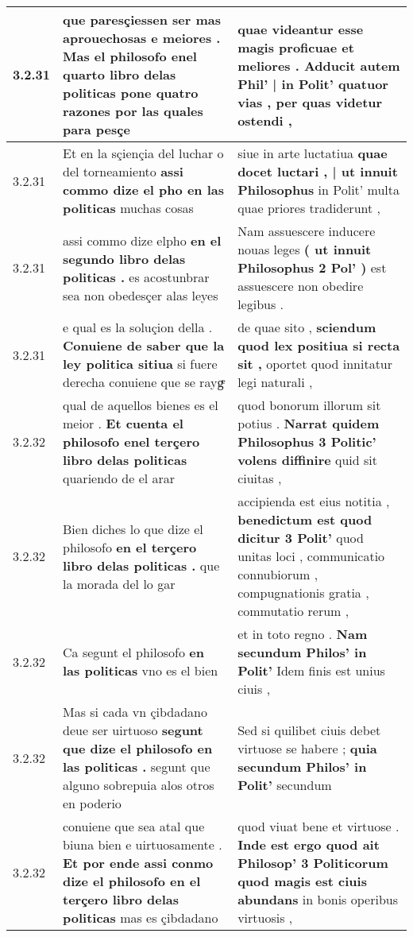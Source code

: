 \begin{tabular}{|p{1cm}|p{6.5cm}|p{6.5cm}|}
3.2.31 & que paresçiessen ser mas aprouechosas e meiores . \textbf{ Mas el philosofo enel quarto libro delas politicas pone quatro razones } por las quales para pesçe & quae videantur esse magis proficuae et meliores . \textbf{ Adducit autem Phil’ | in Polit’ quatuor vias , } per quas videtur ostendi , \\\hline
3.2.31 & Et en la sçiençia del luchar o del torneamiento \textbf{ assi commo dize el pho en las politicas } muchas cosas & siue in arte luctatiua \textbf{ quae docet luctari , | ut innuit Philosophus } in Polit’ multa quae priores tradiderunt , \\\hline
3.2.31 & assi commo dize elpho \textbf{ en el segundo libro delas politicas . } es acostunbrar sea non obedesçer alas leyes & Nam assuescere inducere nouas leges \textbf{ ( ut innuit Philosophus 2 Pol’ ) } est assuescere non obedire legibus . \\\hline
3.2.31 & e qual es la soluçion della . \textbf{ Conuiene de saber que la ley politica sitiua } si fuere derecha conuiene que se raygͤ & de quae sito , \textbf{ sciendum quod lex positiua si recta sit , } oportet quod innitatur legi naturali , \\\hline
3.2.32 & qual de aquellos bienes es el meior . \textbf{ Et cuenta el philosofo enel terçero libro delas politicas } quariendo de el arar & quod bonorum illorum sit potius . \textbf{ Narrat quidem Philosophus 3 Politic’ volens diffinire } quid sit ciuitas , \\\hline
3.2.32 & Bien diches lo que dize el philosofo \textbf{ en el terçero libro delas politicas . } que la morada del lo gar & accipienda est eius notitia , \textbf{ benedictum est quod dicitur 3 Polit’ } quod unitas loci , communicatio connubiorum , compugnationis gratia , commutatio rerum , \\\hline
3.2.32 & Ca segunt el philosofo \textbf{ en las politicas } vno es el bien & et in toto regno . \textbf{ Nam secundum Philos’ in Polit’ } Idem finis est unius ciuis , \\\hline
3.2.32 & Mas si cada vn çibdadano deue ser uirtuoso \textbf{ segunt que dize el philosofo en las politicas . } segunt que alguno sobrepuia alos otros en poderio & Sed si quilibet ciuis debet virtuose se habere ; \textbf{ quia secundum Philos’ in Polit’ } secundum \\\hline
3.2.32 & conuiene que sea atal que biuna bien e uirtuosamente . \textbf{ Et por ende assi conmo dize el philosofo en el terçero libro delas politicas } mas es çibdadano & quod viuat bene et virtuose . \textbf{ Inde est ergo quod ait Philosop’ 3 Politicorum quod magis est ciuis abundans } in bonis operibus virtuosis , \\\hline

\end{tabular}
